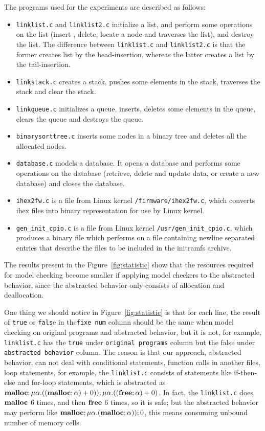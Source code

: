 The programs used for the experiments are described as follows:
\begin{itemize}
\item \texttt{linklist.c} and \texttt{linklist2.c} initialize a list,
  and perform some operations on the list (insert , delete, locate a
  node and traverses the list), and destroy the list. The difference
  between \texttt{linklist.c} and \texttt{linklist2.c} is that the
  former creates list by the head-insertion, whereas the latter creates a list
  by the tail-insertion.
\item \texttt{linkstack.c} creates a stack, pushes some elements in
  the stack, traverses the stack and clear the stack.
\item \texttt{linkqueue.c} initializes a queue, inserts, deletes some
  elements in the queue, clears the queue and destroys the queue.
\item \texttt{binarysorttree.c} inserts some nodes in a binary tree
  and deletes all the allocated nodes.
\item \texttt{database.c} models a database. It opens a database and
  performs some operations on the database (retrieve, delete and
  update data, or create a new database) and closes the database.
\item \texttt{ihex2fw.c} is a file from Linux kernel
  \texttt{/firmware/ihex2fw.c}, which converts ihex files into binary
  representation for use by Linux kernel.
\item \texttt{gen\_init\_cpio.c} is a file from Linux kernel
  \texttt{/usr/gen\_init\_cpio.c}, which produces a binary file which
  performs on a file containing newline separated entries that
  describe the files to be included in the initramfs archive.
\end{itemize}

The results present in the Figure~\ref{fig:statistic} show that the
resources required for model checking become smaller if applying model
checkers to the abstracted behavior, since the abstracted behavior
only consists of allocation and deallocation.

One thing we should notice in Figure~\ref{fig:statistic} is that for
each line, the result of \texttt{true} or \texttt{fals}e in
the\texttt{fixe num} column should be the same when model checking on
original programs and abstracted behavior, but it is not, for example,
\texttt{linklist.c} has the \texttt{true} under \texttt{original
  programs} column but the false under \texttt{abstracted behavior}
column. The reason is that our approach, abstracted behavior, can not
deal with conditional statements, function calls in another files,
loop statements, for example, the \texttt{linklist.c} consists of
statements like if-then-else and for-loop statements, which is
abstracted as $\mathbf{malloc};\mu\alpha.((\mathbf{malloc};\alpha) +
0));\mu\alpha.((\mathbf{free};\alpha) + 0)$. In fact, the \texttt{linklist.c}
does $\mathbf{malloc}$ 6 times, and then $\mathbf{free}$ 6 times, so it is safe; but
the abstracted behavior may perform like
$\mathbf{malloc};\mu\alpha.(\mathbf{malloc};\alpha));0$, this means consuming unbound
number of memory cells.

